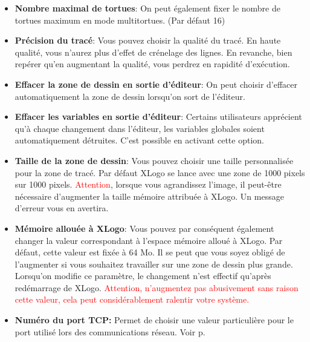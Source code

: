 \begin{itemize}
\begin{itemize}
\begin{itemize}
		\item \textbf{Nombre maximal de tortues}: On peut également fixer le nombre de tortues maximum en mode multitortues. (Par défaut 16)
		\item \textbf{Précision du tracé}: Vous pouvez choisir la qualité du tracé. En haute qualité, vous n'aurez plus d'effet de crénelage des lignes. En revanche, bien repérer qu'en augmentant la qualité, vous perdrez en rapidité d'exécution.
		\item \textbf{Effacer la zone de dessin en sortie d'éditeur}: On peut choisir d'effacer automatiquement la zone de dessin lorsqu'on sort de l'éditeur.
		\item \textbf{Effacer les variables en sortie d'éditeur}: Certains utilisateurs apprécient qu'à chaque changement dans l'éditeur, les variables globales soient automatiquement détruites. C'est possible en activant cette option.
		\item \textbf{Taille de la zone de dessin}: Vous pouvez choisir une taille personnalisée pour la zone de tracé. Par défaut XLogo se lance avec une zone de 1000 pixels sur 1000 pixels. \textcolor{red} {Attention}, lorsque vous agrandissez l'image, il peut-être nécessaire d'augmenter la taille mémoire attribuée à XLogo. Un message d'erreur vous en avertira.
		\item \textbf{Mémoire allouée à XLogo}: Vous pouvez par conséquent également changer la valeur correspondant à l'espace mémoire alloué à XLogo. Par défaut, cette valeur est fixée à 64 Mo. Il se peut que vous soyez obligé de l'augmenter si vous souhaitez travailler sur une zone de dessin plus grande. Lorsqu'on modifie ce paramètre, le changement n'est effectif qu'après redémarrage de XLogo. \textcolor{red} {Attention, n'augmentez pas abusivement sans raison cette valeur, cela peut considérablement ralentir votre système.}
		\item \textbf{Numéro du port TCP:} Permet de choisir une valeur particulière pour le port utilisé lors des communications réseau. Voir p.\pageref{reseau}
	\end{itemize}
	\begin{center}

\end{center}
\end{itemize}
\end{itemize}
